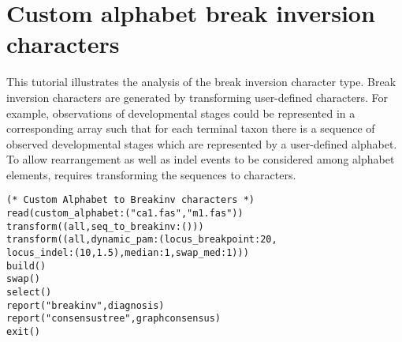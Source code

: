 \section{Custom alphabet break inversion characters}{\label{tutorial 8}}

This tutorial illustrates the analysis of the break inversion character type.  Break inversion characters are generated by transforming user-defined  characters.  
For example, observations of developmental stages could be represented in a corresponding array such that for each terminal taxon there is a sequence of observed developmental stages which are represented by a user-defined alphabet.  To allow rearrangement as well as indel events to be considered among alphabet elements, requires transforming the  sequences to  characters. 

\begin{verbatim}
(* Custom Alphabet to Breakinv characters *)
read(custom_alphabet:("ca1.fas","m1.fas"))
transform((all,seq_to_breakinv:()))
transform((all,dynamic_pam:(locus_breakpoint:20,
locus_indel:(10,1.5),median:1,swap_med:1)))
build()
swap()
select()
report("breakinv",diagnosis)
report("consensustree",graphconsensus)
exit()
\end{verbatim}

